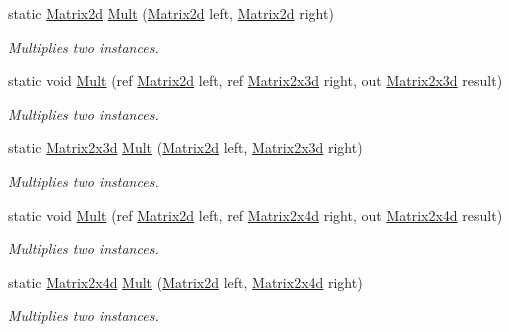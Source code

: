 \begin{DoxyCompactItemize}
static \hyperlink{struct_open_t_k_1_1_matrix2d}{Matrix2d} \hyperlink{struct_open_t_k_1_1_matrix2d_a8d3d4c2bc0bef79ba42bb18b65906431}{Mult} (\hyperlink{struct_open_t_k_1_1_matrix2d}{Matrix2d} left, \hyperlink{struct_open_t_k_1_1_matrix2d}{Matrix2d} right)
\begin{DoxyCompactList}\small\item\em Multiplies two instances. \end{DoxyCompactList}\item 
static void \hyperlink{struct_open_t_k_1_1_matrix2d_adee88cb1d07dd780aa545451760fb8cc}{Mult} (ref \hyperlink{struct_open_t_k_1_1_matrix2d}{Matrix2d} left, ref \hyperlink{struct_open_t_k_1_1_matrix2x3d}{Matrix2x3d} right, out \hyperlink{struct_open_t_k_1_1_matrix2x3d}{Matrix2x3d} result)
\begin{DoxyCompactList}\small\item\em Multiplies two instances. \end{DoxyCompactList}\item 
static \hyperlink{struct_open_t_k_1_1_matrix2x3d}{Matrix2x3d} \hyperlink{struct_open_t_k_1_1_matrix2d_ada9ba54ff2bc16e69f17eb8814b4dd30}{Mult} (\hyperlink{struct_open_t_k_1_1_matrix2d}{Matrix2d} left, \hyperlink{struct_open_t_k_1_1_matrix2x3d}{Matrix2x3d} right)
\begin{DoxyCompactList}\small\item\em Multiplies two instances. \end{DoxyCompactList}\item 
static void \hyperlink{struct_open_t_k_1_1_matrix2d_ab4e6ad57022429b8666224a312cf0efd}{Mult} (ref \hyperlink{struct_open_t_k_1_1_matrix2d}{Matrix2d} left, ref \hyperlink{struct_open_t_k_1_1_matrix2x4d}{Matrix2x4d} right, out \hyperlink{struct_open_t_k_1_1_matrix2x4d}{Matrix2x4d} result)
\begin{DoxyCompactList}\small\item\em Multiplies two instances. \end{DoxyCompactList}\item 
static \hyperlink{struct_open_t_k_1_1_matrix2x4d}{Matrix2x4d} \hyperlink{struct_open_t_k_1_1_matrix2d_a764521ce224de44fd1b18d5d151f4ee9}{Mult} (\hyperlink{struct_open_t_k_1_1_matrix2d}{Matrix2d} left, \hyperlink{struct_open_t_k_1_1_matrix2x4d}{Matrix2x4d} right)
\begin{DoxyCompactList}\small\item\em Multiplies two instances. \end{DoxyCompactList}\item 

\end{DoxyCompactItemize}
